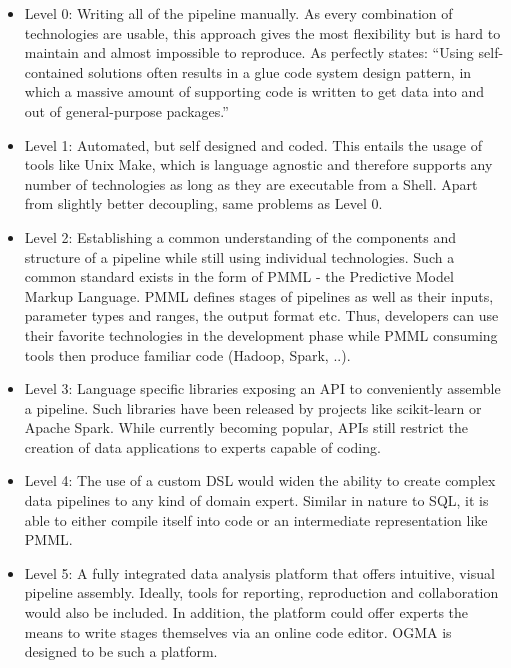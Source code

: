 \begin{itemize}
	\item Level 0: Writing all of the pipeline manually. As every combination of technologies are usable, this approach gives the most flexibility but is hard to maintain and almost impossible to reproduce. As \citep{MLTechnicalDebt} perfectly states: ``Using self-contained solutions often results in a glue code system design pattern, in which a massive amount of supporting code is written to get data into and out of general-purpose packages.''
	
	\item Level 1: Automated, but self designed and coded. This entails the usage of tools like Unix Make, which is language agnostic and therefore supports any number of technologies as long as they are executable from a Shell. Apart from slightly better decoupling, same problems as Level 0.
	
	\item Level 2: Establishing a common understanding of the components and structure of a pipeline while still using individual technologies. Such a common standard exists in the form of PMML - the Predictive Model Markup Language. PMML defines stages of pipelines as well as their inputs, parameter types and ranges, the output format etc. Thus, developers can use their favorite technologies in the development phase while PMML consuming tools then produce familiar code (Hadoop, Spark, ..).
	
	\item Level 3: Language specific libraries exposing an API to conveniently assemble a pipeline. Such libraries have been released by projects like scikit-learn or Apache Spark. While currently becoming popular, APIs still restrict the creation of data applications to experts capable of coding.
	
	\item Level 4: The use of a custom DSL would widen the ability to create complex data pipelines to any kind of domain expert. Similar in nature to SQL, it is able to either compile itself into code or an intermediate representation like PMML.
	
	\item Level 5: A fully integrated data analysis platform that offers intuitive, visual pipeline assembly. Ideally, tools for reporting, reproduction and collaboration would also be included. In addition, the platform could offer experts the means to write stages themselves via an online code editor. OGMA is designed to be such a platform.
\end{itemize}



